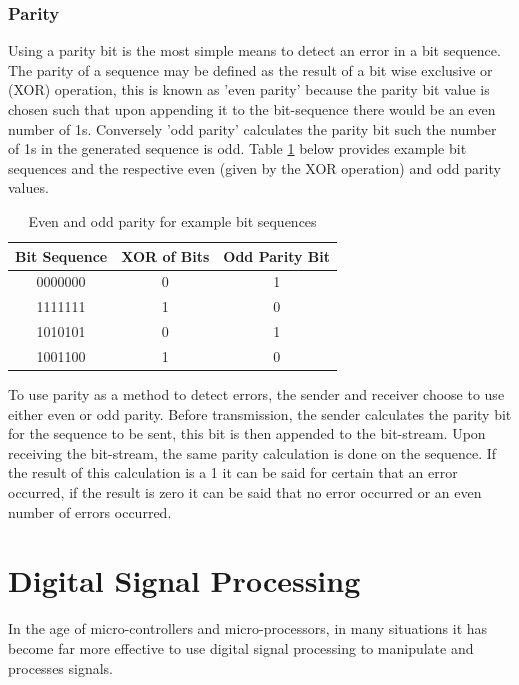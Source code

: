 \subsubsection{Parity}
Using a parity bit is the most simple means to detect an error in a bit sequence. The parity of a sequence may be defined as the result of a bit wise exclusive or (XOR) operation, this is known as 'even parity' because the parity bit value is chosen such that upon appending it to the bit-sequence there would be an even number of 1s. Conversely 'odd parity' calculates the parity bit such the number of 1s in the generated sequence is odd. Table \ref{tbl:party_examples} below provides example bit sequences and the respective even (given by the XOR operation) and odd parity values.

\begin{table}[H]
	\centering
	\begin{tabular}{ccc}
		\hline
		\multicolumn{1}{l}{\textbf{Bit Sequence}} & \textbf{XOR of Bits} & \multicolumn{1}{l}{\textbf{Odd Parity Bit}} \\ \hline
		0000000 & 0 & 1 \\ \hline
		1111111 & 1 & 0 \\ \hline
		1010101 & 0 & 1 \\ \hline
		1001100 & 1 & 0 \\ \hline
	\end{tabular}
	\caption{Even and odd parity for example bit sequences}
	\label{tbl:party_examples}
\end{table}

 To use parity as a method to detect errors, the sender and receiver choose to use either even or odd parity. Before transmission, the sender calculates the parity bit for the sequence to be sent, this bit is then appended to the bit-stream. Upon receiving the bit-stream, the same parity calculation is done on the sequence. If the result of this calculation is a 1 it can be said for certain that an error occurred, if the result is zero it can be said that no error occurred or an even number of errors occurred.







\section{Digital Signal Processing}
In the age of micro-controllers and micro-processors, in many situations it has become far more effective to use digital signal processing to manipulate and processes signals.

